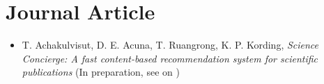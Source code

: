 \section{\sc Journal Article}

\begin{itemize}[leftmargin=0cm, label={}]

\item T. Achakulvisut, D. E. Acuna, T. Ruangrong, K. P. Kording, {\em Science Concierge: A fast content-based recommendation system for scientific publications}
(In preparation, see on \href{https://github.com/titipata/science_concierge}{\faGithubAlt})

\end{itemize}
